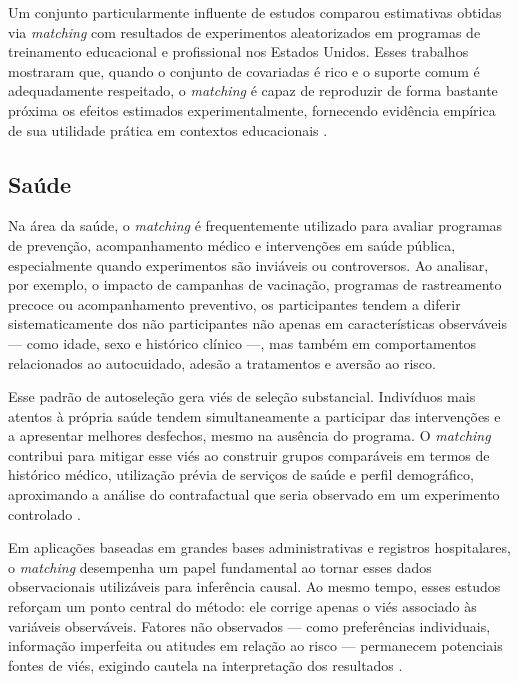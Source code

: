 Um conjunto particularmente influente de estudos comparou estimativas obtidas via \textit{matching} com resultados de experimentos aleatorizados em programas de treinamento educacional e profissional nos Estados Unidos. Esses trabalhos mostraram que, quando o conjunto de covariadas é rico e o suporte comum é adequadamente respeitado, o \textit{matching} é capaz de reproduzir de forma bastante próxima os efeitos estimados experimentalmente, fornecendo evidência empírica de sua utilidade prática em contextos educacionais \citep{dehejia1999causal, dehejia2002propensity}.

\subsection*{Saúde}

Na área da saúde, o \textit{matching} é frequentemente utilizado para avaliar programas de prevenção, acompanhamento médico e intervenções em saúde pública, especialmente quando experimentos são inviáveis ou controversos. Ao analisar, por exemplo, o impacto de campanhas de vacinação, programas de rastreamento precoce ou acompanhamento preventivo, os participantes tendem a diferir sistematicamente dos não participantes não apenas em características observáveis — como idade, sexo e histórico clínico —, mas também em comportamentos relacionados ao autocuidado, adesão a tratamentos e aversão ao risco.

Esse padrão de autoseleção gera viés de seleção substancial. Indivíduos mais atentos à própria saúde tendem simultaneamente a participar das intervenções e a apresentar melhores desfechos, mesmo na ausência do programa. O \textit{matching} contribui para mitigar esse viés ao construir grupos comparáveis em termos de histórico médico, utilização prévia de serviços de saúde e perfil demográfico, aproximando a análise do contrafactual que seria observado em um experimento controlado \citep{stuart2010matching}.

Em aplicações baseadas em grandes bases administrativas e registros hospitalares, o \textit{matching} desempenha um papel fundamental ao tornar esses dados observacionais utilizáveis para inferência causal. Ao mesmo tempo, esses estudos reforçam um ponto central do método: ele corrige apenas o viés associado às variáveis observáveis. Fatores não observados — como preferências individuais, informação imperfeita ou atitudes em relação ao risco — permanecem potenciais fontes de viés, exigindo cautela na interpretação dos resultados \citep{imbensrubin2015}.

